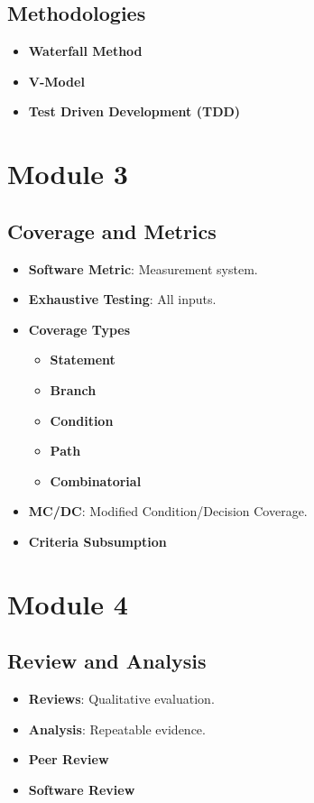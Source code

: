 \documentclass[10pt,portrait]{article}
\begin{document}
\begin{multicols}{ 2 }
\subsection{Methodologies}
\begin{itemize}
    \item \textbf{Waterfall Method}
    \item \textbf{V-Model}
    \item \textbf{Test Driven Development (TDD)}
\end{itemize}

\section{Module 3}

\subsection{Coverage and Metrics}
\begin{itemize}
    \item \textbf{Software Metric}: Measurement system.
    \item \textbf{Exhaustive Testing}: All inputs.
    \item \textbf{Coverage Types}
    \begin{itemize}
        \item \textbf{Statement}
        \item \textbf{Branch}
        \item \textbf{Condition}
        \item \textbf{Path}
        \item \textbf{Combinatorial}
    \end{itemize}
    \item \textbf{MC/DC}: Modified Condition/Decision Coverage.
    \item \textbf{Criteria Subsumption}
\end{itemize}

\section{Module 4}

\subsection{Review and Analysis}
\begin{itemize}
    \item \textbf{Reviews}: Qualitative evaluation.
    \item \textbf{Analysis}: Repeatable evidence.
    \item \textbf{Peer Review}
    \item \textbf{Software Review}
\end{itemize}


\end{multicols}
\end{document}
